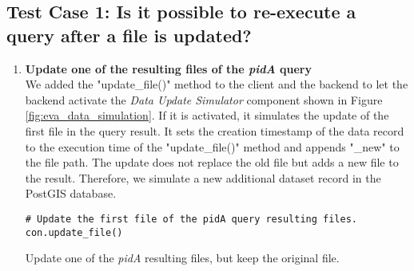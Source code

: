 \documentclass[draft,final]{vutinfth} %
\newenvironment{code}{\captionsetup{type=listing}}{}
\begin{document}
\subsection{Test Case 1: Is it possible to re-execute a query after a file is updated?}	\label{Tab:eva_datachanges_tc1}

\begin{enumerate}
	\setcounter{enumi}{+1}
	\item \textbf{Update one of the resulting files of the \textit{pidA} query} \\
	We added the "update\_file()" method to the client and the backend to let the backend activate the \textit{Data Update Simulator} component shown in Figure \ref{fig:eva_data_simulation}. If it is activated, it simulates the update of the first file in the query result. It sets the creation timestamp of the data record to the execution time of the "update\_file()" method and appends "\_new" to the file path. The update does not replace the old file but adds a new file to the result. Therefore, we simulate a new additional dataset record in the PostGIS database.
	\begin{code}
		\begin{verbatim}
# Update the first file of the pidA query resulting files.
con.update_file()
		\end{verbatim}
		\caption{Update one of the \textit{pidA} resulting files, but keep the original file.}
		\label{lst:eva_datachange_2}
	\end{code}
	

\end{enumerate}
\end{document}
